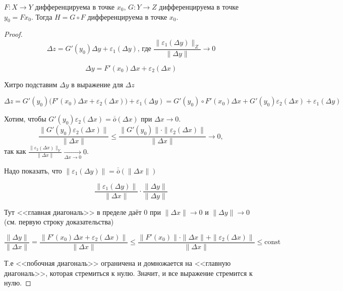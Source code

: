 \begin{statement}\label{Freshe-diff-4}
    $F: X \to Y$ дифференцируема в точке $x_0$, $G: Y \to Z$ дифференцируема в точке $y_0 = F x_0$. Тогда $H = G \circ F$ дифференцируема в точке $x_0$.
\end{statement}
\begin{proof}
        \[ \Delta z = G'(y_0) \Delta y + \varepsilon_1(\Delta y) \text{, где } \frac{\|\varepsilon_1(\Delta y)\|_Z}{\|\Delta y \|} \to 0 \]

        \[
        \Delta y = F'(x_0) \Delta x + \varepsilon_2(\Delta x)
        \]

        Хитро подставим $\Delta y$ в выражение для $\Delta z$

        \[ 
        \Delta z = G'(y_0)\Big(F'(x_0) \Delta x + \varepsilon_2(\Delta x)\Big) + \varepsilon_1(\Delta y)=G'(y_0) \circ F'(x_0) \Delta x + G'(y_0) \varepsilon_2(\Delta x) + \varepsilon_1(\Delta y)
        \]

        Хотим, чтобы $G'(y_0) \varepsilon_2(\Delta x) = \overline{\overline{o}}(\Delta x)$ при $\Delta x \to 0$.
        \[
        \frac{\|G'(y_0) \varepsilon_2(\Delta x)\|}{\|\Delta x\|}
        \leqslant \frac{\|G'(y_0)\| \cdot \|\varepsilon_2(\Delta x)\|}{\|\Delta x\|} \to 0,
        \]
        так как $\frac{\| \varepsilon_2(\Delta x) \|_Y}{\| \Delta x \|} \xrightarrow[\Delta x \to 0]{} 0$.
        
        Надо показать, что $\|\varepsilon_1(\Delta y)\| = \overline{\overline{o}}(\|\Delta x\|)$ 

        \[
        \frac{\|\varepsilon_1(\Delta y)\|}{\|\Delta x\|} \cdot \frac{\|\Delta y\|}{\|\Delta y\|}
        \]
        
        Тут <<главная диагональ>> в пределе даёт 0 при $\|\Delta x \| \to 0$ и $\|\Delta y \| \to 0$ (см. первую строку доказательства)
        
        \[
        \frac{\|\Delta y\|}{\|\Delta x\|} = 
        \frac{\|F'(x_0) \Delta x + \varepsilon_2(\Delta x)\|}{\|\Delta x\|} \leqslant 
        \frac{\|F'(x_0)\| \cdot \|\Delta x\| + \|\varepsilon_2(\Delta x)\|}{\|\Delta x\|} \leq \text{const}
        \]

        Т.е <<побочная диагональ>> ограничена и домножается на <<главную диагональ>>, которая стремиться к нулю. Значит, и все выражение стремится к нулю.
\end{proof}

